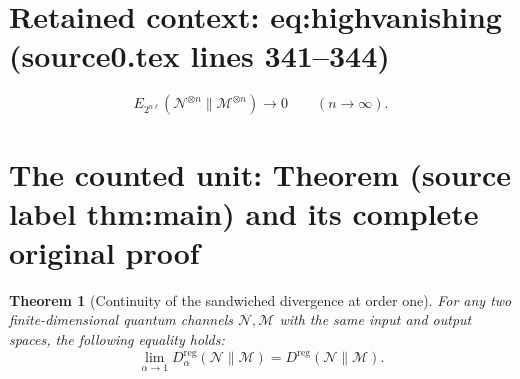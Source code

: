 \documentclass[10pt,a4paper]{amsart}
\newcommand{\Dt}{D}
\newcommand{\M}{\mathcal M}
\newcommand{\N}{\mathcal N}
\newcommand{\reg}{\mathrm{reg}}
\theoremstyle{plain}
\newtheorem{theorem}{Theorem}
\begin{document}
\section*{Retained context: eq:highvanishing (source0.tex lines 341--344)}

\begin{equation}\label{eq:highvanishing}
 E_{2^{n\ell}}(\N^{\otimes n}\|\M^{\otimes n})\longrightarrow0
 \qquad(n\to\infty).
\end{equation}


\section{The counted unit: Theorem (source label thm:main) and its complete original proof}

\begin{theorem}[Continuity of the sandwiched divergence at order one]\label{thm:main}
For any two finite-dimensional quantum channels $\N,\M$ with the same input and output spaces, the following equality holds:
\begin{equation}\label{eq:main}
 \lim_{\alpha\to1}\Dt_\alpha^{\reg}(\N\|\M)
       =D^{\reg}(\N\|\M).
\end{equation}
\end{theorem}
\end{document}
